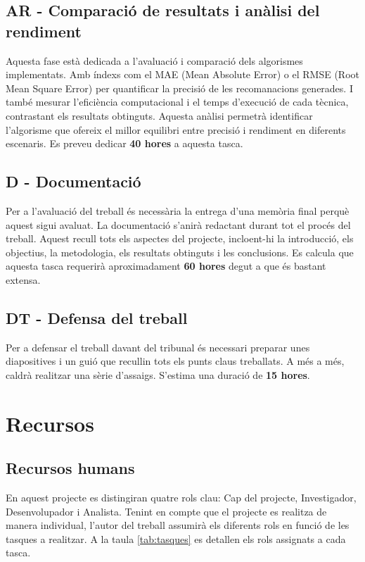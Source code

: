 \documentclass[a4paper,12pt]{report}
\begin{document}
\subsection{AR - Comparació de resultats i anàlisi del rendiment}

Aquesta fase està dedicada a l’avaluació i comparació dels algorismes implementats.
Amb índexs com el MAE (Mean Absolute Error) o el RMSE (Root Mean Square Error) per quantificar la precisió de les recomanacions generades.
I també mesurar l’eficiència computacional i el temps d’execució de cada tècnica, contrastant els resultats obtinguts. Aquesta anàlisi permetrà identificar l’algorisme que ofereix el millor equilibri entre precisió i rendiment en diferents escenaris.
Es preveu dedicar \textbf{40 hores} a aquesta tasca.

\subsection{D - Documentació}

Per a l'avaluació del treball és necessària la entrega d'una memòria final perquè aquest sigui avaluat.
La documentació s'anirà redactant durant tot el procés del treball.
Aquest recull tots els aspectes del projecte, incloent-hi la introducció, els objectius, la metodologia, els resultats obtinguts i les conclusions.
Es calcula que aquesta tasca requerirà aproximadament \textbf{60 hores} degut a que és bastant extensa.

\subsection{DT - Defensa del treball}

Per a defensar el treball davant del tribunal és necessari preparar unes diapositives i un guió que recullin tots els punts claus treballats. 
A més a més, caldrà realitzar una sèrie d'assaigs.
S'estima una duració de \textbf{15 hores}.

\section{Recursos}

\subsection{Recursos humans}

En aquest projecte es distingiran quatre rols clau: Cap del projecte, Investigador, Desenvolupador i Analista.  
Tenint en compte que el projecte es realitza de manera individual, l'autor del treball assumirà els diferents rols en funció de les tasques a realitzar.  
A la taula \ref{tab:tasques} es detallen els rols assignats a cada tasca.
\end{document}
